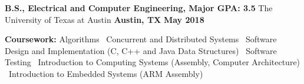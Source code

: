 \begin{cventries}
  \cventry
    {\textbf{\normalsize B.S., Electrical and Computer Engineering, Major GPA: \large 3.5}}
    {\large The University of Texas at Austin}
    {\normalsize \textbf{Austin, TX}}
    {\normalsize \textbf{May 2018}}
    {
      \begin{cvitems}
        \item {\normalsize \textbf{Coursework:} Algorithms {\LARGE\textbullet }\ Concurrent and Distributed Systems {\LARGE\textbullet }\ Software Design and Implementation (C, C++ and Java Data Structures) {\LARGE\textbullet }\ Software Testing {\LARGE\textbullet }\ Introduction to Computing Systems (Assembly, Computer Architecture) \\{\LARGE\textbullet }\ Introduction to Embedded Systems (ARM Assembly)}
      \end{cvitems}
    }
\end{cventries}
